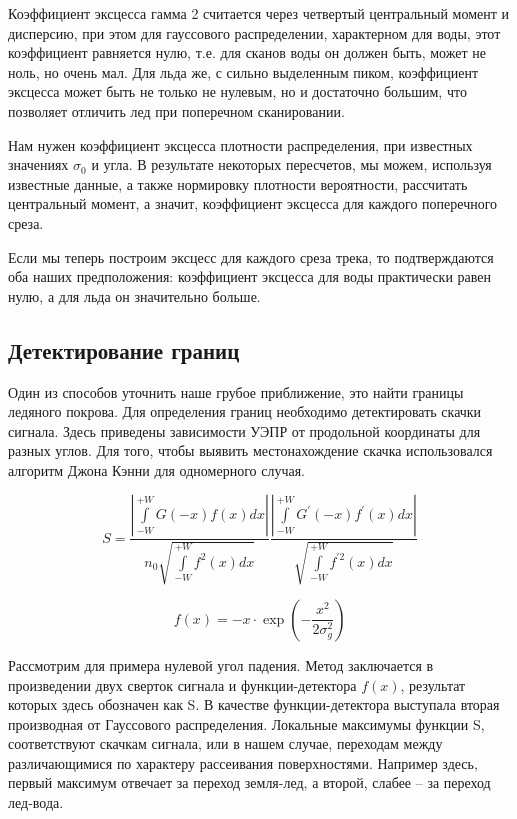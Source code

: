 Коэффициент эксцесса гамма 2 считается через четвертый центральный момент и дисперсию, при этом для гауссового
распределении, характерном для воды, этот коэффициент равняется нулю, т.е. для сканов воды он должен быть, может не
ноль, но очень мал. Для льда же, с сильно выделенным пиком, коэффициент эксцесса может быть не только не нулевым, но и
достаточно большим, что позволяет отличить лед при поперечном сканировании. 

Нам нужен коэффициент эксцесса плотности распределения, при известных значениях $\sigma_0$ и угла. В результате некоторых
пересчетов, мы можем, используя известные данные, а также нормировку плотности вероятности, рассчитать центральный
момент, а значит, коэффициент эксцесса для каждого поперечного среза. 

Если мы теперь построим эксцесс для каждого среза трека, то подтверждаются оба наших предположения: коэффициент эксцесса
для воды практически равен нулю, а для льда он значительно больше.




\subsection{Детектирование границ}
Один из способов уточнить наше грубое приближение, это найти границы ледяного покрова.
Для определения границ необходимо детектировать скачки сигнала. Здесь приведены зависимости УЭПР от продольной
координаты для разных углов. Для того, чтобы выявить местонахождение скачка использовался алгоритм Джона Кэнни \cite{canny} для
одномерного случая.

\begin{equation}
  S = \frac{\left|\int \limits_{-W}^{+W} G(-x) f(x) d x\right|}{n_{0} \sqrt{\int \limits_{-W}^{+W} f^{2}(x) d x}} \frac{\left|\int \limits_{-W}^{+W} G^{\prime}(-x) f^{\prime}(x) d x\right|}{\sqrt{\int \limits_{-W}^{+W} f^{\prime 2}(x) d x}}
  \label{eq:S}
\end{equation}

\begin{equation}
  f(x) = -x\cdot \exp(-\frac{x^2}{2\sigma^2_g})
  \label{eq:fx}
\end{equation}

Рассмотрим для примера нулевой угол падения. Метод заключается в произведении двух сверток сигнала и
функции-детектора $f(x)$, результат которых здесь обозначен как S. В качестве функции-детектора выступала вторая производная от
Гауссового распределения.  Локальные максимумы функции S, соответствуют скачкам сигнала, или в нашем случае, переходам
между различающимися по характеру рассеивания поверхностями. Например здесь, первый максимум отвечает за переход
земля-лед, а второй, слабее – за переход лед-вода. 

